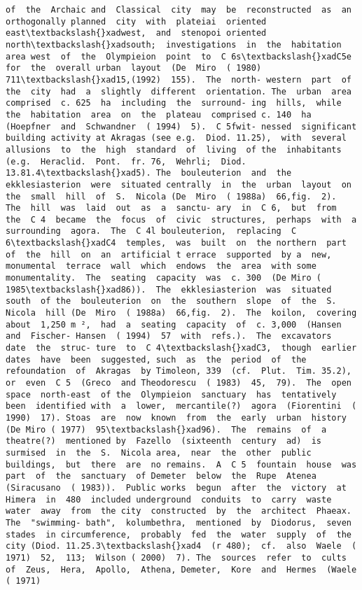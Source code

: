 \documentclass[11pt]{article}
\begin{document}
\begin{Verbatim}[commandchars=\\\{\}]
 of  the  Archaic and  Classical  city  may  be  reconstructed  as  an  orthogonally planned  city  with  plateiai  oriented  east\textbackslash{}xadwest,  and  stenopoi oriented  north\textbackslash{}xadsouth;  investigations  in  the  habitation  area west  of  the  Olympieion  point  to  C 6s\textbackslash{}xadC5e  for  the  overall urban  layout  (De  Miro  ( 1980)  711\textbackslash{}xad15,(1992)  155).  The  north- western  part  of  the  city  had  a  slightly  different  orientation. The  urban  area  comprised  c. 625  ha  including  the  surround- ing  hills,  while  the  habitation  area  on  the  plateau  comprised c. 140  ha  (Hoepfner  and  Schwandner  ( 1994)  5).  C 5fwit- nessed  significant building activity at Akragas (see e.g.  Diod. 11.25),  with  several  allusions  to  the  high  standard  of  living  of the  inhabitants  (e.g.  Heraclid.  Pont.  fr. 76,  Wehrli;  Diod. 13.81.4\textbackslash{}xad5). The  bouleuterion  and  the  ekklesiasterion  were  situated centrally  in  the  urban  layout  on  the  small  hill  of  S.  Nicola (De  Miro  ( 1988a)  66,fig.  2).  The  hill  was  laid  out  as  a  sanctu- ary  in  C 6,  but  from  the  C 4  became  the  focus  of  civic  structures,  perhaps  with  a  surrounding  agora.  The  C 4l bouleuterion,  replacing  C 6\textbackslash{}xadC4  temples,  was  built  on  the northern  part  of  the  hill  on  an  artificial t errace  supported  by a  new,  monumental  terrace  wall  which  endows  the  area  with some  monumentality.  The  seating  capacity  was  c. 300  (De Miro ( 1985\textbackslash{}xad86)).  The  ekklesiasterion  was  situated  south  of the  bouleuterion  on  the  southern  slope  of  the  S.  Nicola  hill (De  Miro  ( 1988a)  66,fig.  2).  The  koilon,  covering  about  1,250 m ²,  had  a  seating  capacity  of  c. 3,000  (Hansen  and  Fischer- Hansen  ( 1994)  57  with  refs.).  The  excavators  date  the  struc- ture  to  C 4\textbackslash{}xadC3,  though  earlier  dates  have  been  suggested, such  as  the  period  of  the  refoundation  of  Akragas  by Timoleon, 339  (cf.  Plut.  Tim. 35.2),  or  even  C 5  (Greco  and Theodorescu  ( 1983)  45,  79).  The  open  space  north-east  of the  Olympieion  sanctuary  has  tentatively  been  identified with  a  lower,  mercantile(?)  agora  (Fiorentini  ( 1990)  17). Stoas  are  now  known  from  the  early  urban  history  (De Miro ( 1977)  95\textbackslash{}xad96).  The  remains  of  a  theatre(?)  mentioned by  Fazello  (sixteenth  century  ad)  is  surmised  in  the  S.  Nicola area,  near  the  other  public  buildings,  but  there  are  no remains.  A  C 5  fountain  house  was  part  of  the  sanctuary  of Demeter  below  the  Rupe  Atenea  (Siracusano  ( 1983)).  Public works  begun  after  the  victory  at  Himera  in  480  included underground  conduits  to  carry  waste  water  away  from  the city  constructed  by  the  architect  Phaeax.  The  "swimming- bath",  kolumbethra,  mentioned  by  Diodorus,  seven  stades  in circumference,  probably  fed  the  water  supply  of  the  city (Diod. 11.25.3\textbackslash{}xad4  (r 480);  cf.  also  Waele  ( 1971)  52,  113;  Wilson ( 2000)  7). The  sources  refer  to  cults  of  Zeus,  Hera,  Apollo,  Athena, Demeter,  Kore  and  Hermes  (Waele  ( 1971)  
\end{Verbatim}
\end{document}
